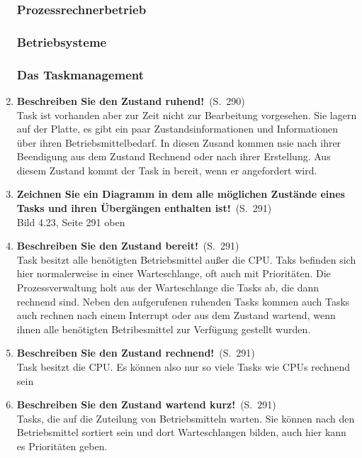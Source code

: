 \documentclass[a4paper,12pt]{article}
\newcommand{\statement}[3]{\pagebreak[3]\item {\textbf{#1!}}\ (S.\ #2)#3}
\newcommand{\normaltext}[1]{\\#1}
\newcommand{\page}[1]{#1}
\begin{document}
\begin{enumerate}
  \subsubsection{Prozessrechnerbetrieb}

  \subsubsection{Betriebsysteme}

  \subsubsection{Das Taskmanagement}

  \statement{Beschreiben Sie den Zustand ruhend}{\page{290}}
  {
    \normaltext{Task ist vorhanden aber zur Zeit nicht zur Bearbeitung vorgesehen.
                Sie lagern auf der Platte, es gibt ein paar Zustandsinformationen
                und Informationen über ihren Betriebsmittelbedarf. In diesen Zusand
                kommen nsie nach ihrer Beendigung aus dem Zustand Rechnend oder nach
                ihrer Erstellung. Aus diesem Zustand kommt der Task in bereit, wenn
                er angefordert wird.}
  }

  \statement{Zeichnen Sie ein Diagramm in dem alle möglichen Zustände eines
             Tasks und ihren Übergängen enthalten ist}{\page{291}}
  {
    \normaltext{Bild 4.23, Seite 291 oben}
  }

  \statement{Beschreiben Sie den Zustand bereit}{\page{291}}
  {
    \normaltext{Task besitzt alle benötigten Betriebsmittel außer die CPU. Taks befinden
                sich hier normalerweise in einer Warteschlange, oft auch mit Prioritäten.
                Die Prozessverwaltung holt aus der Warteschlange die Tasks ab, die dann
                rechnend sind. Neben den aufgerufenen ruhenden Tasks kommen auch Tasks auch
                rechnen nach einem Interrupt oder aus dem Zustand wartend, wenn ihnen alle
                benötigten Betribesmittel zur Verfügung gestellt wurden.}
  }

  \statement{Beschreiben Sie den Zustand rechnend}{\page{291}}
  {
    \normaltext{Task besitzt die CPU. Es können also nur so viele Tasks wie CPUs rechnend sein}
  }

  \statement{Beschreiben Sie den Zustand wartend kurz}{\page{291}}
  {
    \normaltext{Tasks, die auf die Zuteilung von Betriebsmitteln warten. Sie können nach
                den Betriebsmittel sortiert sein und dort Warteschlangen bilden, auch hier
                kann es Prioritäten geben.}
  }


\end{enumerate}
\end{document}
